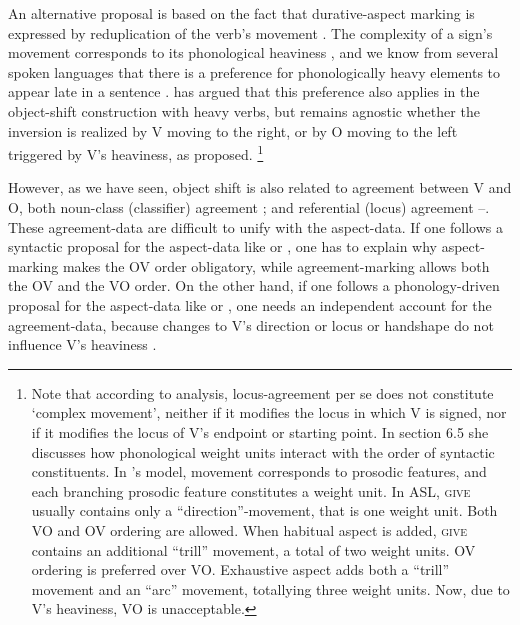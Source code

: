 \documentclass[output=paper]{langscibook}
\begin{document}
An alternative proposal is based on the fact that durative-aspect
marking is expressed by reduplication of the verb’s movement 
\citep{Klima.Bellugi.1979}. The complexity of a sign’s movement corresponds to
its phonological heaviness \citep{Brentari.1998}, and we know from several
spoken languages that there is a preference for phonologically heavy
elements to appear late in a sentence .
\citet{Brentari.1998} has argued that this preference also applies in the
object-shift construction with heavy verbs, but remains agnostic
whether the inversion is realized by V moving to the right, or by O
moving to the left triggered by V’s heaviness, as \citet{Liddell.1980}
proposed.%
\footnote{
    Note that according to  analysis, locus-agreement per se
    does not constitute `complex movement', neither if it modifies the locus in which V
    is signed, nor if it modifies the locus of V’s endpoint or starting point. In section 6.5
    she discusses how phonological weight units interact with the order of syntactic
    constituents. In \citeauthor{Brentari.1998}’s model, movement corresponds to prosodic features, and
    each branching prosodic feature constitutes a weight unit. In ASL, \textsc{give} usually
    contains only a “direction”-movement, that is one weight unit. Both VO and OV
    ordering are allowed. When habitual aspect is added, \textsc{give} contains an additional
    “trill” movement, a total of two weight units. OV ordering is preferred over VO.
    Exhaustive aspect adds both a “trill” movement and an “arc” movement, totallying
    three weight units. Now, due to V’s heaviness, VO is unacceptable.
}

However, as we have seen, object shift is also related to
agreement between V and O, both noun-class (classifier) agreement
; and referential (locus) agreement --. 
These agreement-data
are difficult to unify with the aspect-data. If one follows a syntactic
proposal for the aspect-data like \citet{Matsuoka.1997} or \citet{Braze.2004},
one has to explain why aspect-marking makes the OV order
obligatory, while agreement-marking allows both the OV and the VO
order. On the other hand, if one follows a phonology-driven proposal
for the aspect-data like \citet{Liddell.1980} or \citet{Brentari.1998}, one needs an
independent account for the agreement-data, because changes to V’s
direction or locus or handshape do not influence V’s heaviness
\citep{Brentari.1998}.
\end{document}
